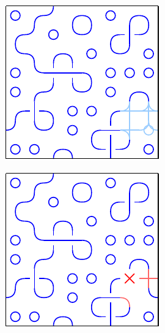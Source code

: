 \begin{center}
    \captionsetup{type=figure}
    \begin{minipage}{.31\textwidth}
        \centering
        \includegraphics[width=0.95\linewidth]{img/WFC backtracking before.pdf}
         \label{fig:wfc-before-backtracking}
    \end{minipage}%
    \begin{minipage}{.31\textwidth}
        \centering
        \includegraphics[width=0.95\linewidth]{img/WFC backtracking dead end.pdf}

\end{minipage}
\end{center}
